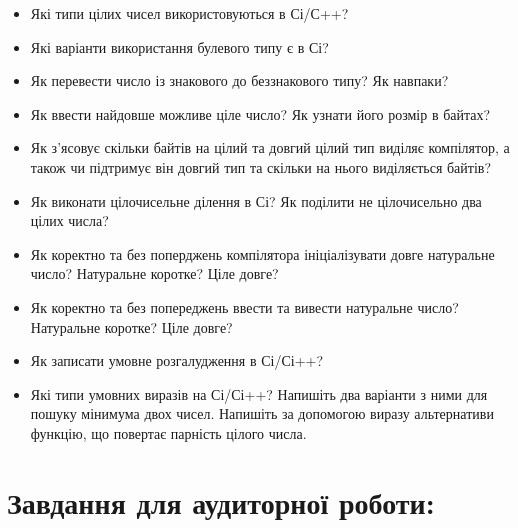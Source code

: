\documentclass[a5paper,titlepage,openany,twoside,draft]{book_unv}%
\begin{document}
\begin{itemize}
\item Які типи цілих чисел використовуються в Сі/С++?
\item Які варіанти використання булевого типу є в Сі?
\item Як перевести число із знакового до беззнакового типу? Як навпаки?
\item Як ввести найдовше можливе ціле число? Як узнати його розмір в
байтах?
\item Як з'ясовує скільки байтів на цілий та довгий
цілий тип виділяє компілятор, а також чи підтримує він довгий тип та
скільки на нього виділяється байтів?
\item Як виконати цілочисельне ділення в Сі? Як поділити не цілочисельно
два цілих числа?
\item Як коректно та без поперджень компілятора ініціалізувати довге
натуральне число? Натуральне коротке? Ціле довге?
\item Як коректно та без попереджень ввести та вивести натуральне число?
Натуральне коротке? Ціле довге?
\item Як записати умовне розгалудження в Сі/Сі++?
\item Які типи умовних виразів на Сі/Сі++? Напишіть два варіанти з ними для
пошуку мінимума двох чисел. Напишіть за допомогою виразу альтернативи
функцію, що повертає парність цілого числа.
\end{itemize}

\section{Завдання для аудиторної роботи:}
\end{document}

